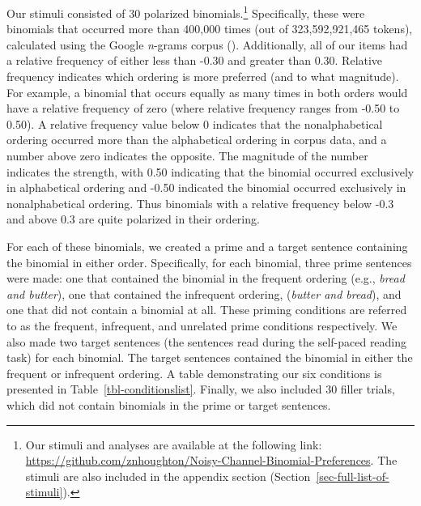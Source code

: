 \documentclass[
  12pt,
]{scrartcl}
\begin{document}
Our stimuli consisted of 30 polarized binomials.\footnote{Our stimuli
  and analyses are available at the following link:
  \url{https://github.com/znhoughton/Noisy-Channel-Binomial-Preferences}.
  The stimuli are also included in the appendix section
  (Section~\ref{sec-full-list-of-stimuli}).} Specifically, these were
binomials that occurred more than 400,000 times (out of 323,592,921,465
tokens), calculated using the Google \emph{n}-grams corpus
(). Additionally, all of our items had a relative frequency of
either less than -0.30 and greater than 0.30. Relative frequency
indicates which ordering is more preferred (and to what magnitude). For
example, a binomial that occurs equally as many times in both orders
would have a relative frequency of zero (where relative frequency ranges
from -0.50 to 0.50). A relative frequency value below 0 indicates that
the nonalphabetical ordering occurred more than the alphabetical
ordering in corpus data, and a number above zero indicates the opposite.
The magnitude of the number indicates the strength, with 0.50 indicating
that the binomial occurred exclusively in alphabetical ordering and
-0.50 indicated the binomial occurred exclusively in nonalphabetical
ordering. Thus binomials with a relative frequency below -0.3 and above
0.3 are quite polarized in their ordering.

For each of these binomials, we created a prime and a target sentence
containing the binomial in either order. Specifically, for each
binomial, three prime sentences were made: one that contained the
binomial in the frequent ordering (e.g., \emph{bread and butter}), one
that contained the infrequent ordering, (\emph{butter and bread}), and
one that did not contain a binomial at all. These priming conditions are
referred to as the frequent, infrequent, and unrelated prime conditions
respectively. We also made two target sentences (the sentences read
during the self-paced reading task) for each binomial. The target
sentences contained the binomial in either the frequent or infrequent
ordering. A table demonstrating our six conditions is presented in
Table~\ref{tbl-conditionslist}. Finally, we also included 30 filler
trials, which did not contain binomials in the prime or target
sentences.
\end{document}
